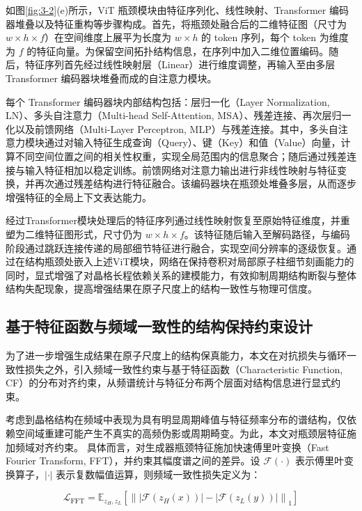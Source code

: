如图\ref{fig:3-2}(e)所示，ViT 瓶颈模块由特征序列化、线性映射、Transformer 编码器堆叠以及特征重构等步骤构成。首先，将瓶颈处融合后的二维特征图（尺寸为 $w \times h \times f$）在空间维度上展平为长度为 $w \times h$ 的 token 序列，每个 token 为维度为 $f$ 的特征向量。为保留空间拓扑结构信息，在序列中加入二维位置编码。随后，特征序列首先经过线性映射层（Linear）进行维度调整，再输入至由多层 Transformer 编码器块堆叠而成的自注意力模块。

每个 Transformer 编码器块内部结构包括：层归一化（Layer Normalization, LN）、多头自注意力（Multi-head Self-Attention, MSA）、残差连接、再次层归一化以及前馈网络（Multi-Layer Perceptron, MLP）与残差连接。其中，多头自注意力模块通过对输入特征生成查询（Query）、键（Key）和值（Value）向量，计算不同空间位置之间的相关性权重，实现全局范围内的信息聚合；随后通过残差连接与输入特征相加以稳定训练。前馈网络对注意力输出进行非线性映射与特征变换，并再次通过残差结构进行特征融合。该编码器块在瓶颈处堆叠多层，从而逐步增强特征的全局上下文表达能力。

经过Transformer模块处理后的特征序列通过线性映射恢复至原始特征维度，并重塑为二维特征图形式，尺寸仍为 $w \times h \times f$。该特征随后输入至解码路径，与编码阶段通过跳跃连接传递的局部细节特征进行融合，实现空间分辨率的逐级恢复。通过在结构瓶颈处嵌入上述ViT模块，网络在保持卷积对局部原子柱细节刻画能力的同时，显式增强了对晶格长程依赖关系的建模能力，有效抑制周期结构断裂与整体结构失配现象，提高增强结果在原子尺度上的结构一致性与物理可信度。

\subsection{基于特征函数与频域一致性的结构保持约束设计}
为了进一步增强生成结果在原子尺度上的结构保真能力，本文在对抗损失与循环一致性损失之外，引入频域一致性约束与基于特征函数（Characteristic Function, CF）的分布对齐约束，从频谱统计与特征分布两个层面对结构信息进行显式约束。

考虑到晶格结构在频域中表现为具有明显周期峰值与特征频率分布的谱结构，仅依赖空间域重建可能产生不真实的高频伪影或周期畸变。为此，本文对瓶颈层特征施加频域对齐约束。
具体而言，对生成器瓶颈特征施加快速傅里叶变换（Fast Fourier Transform, FFT），并约束其幅度谱之间的差异。设 $\mathcal{F}(\cdot)$ 表示傅里叶变换算子，$|\cdot|$ 表示复数幅值运算，则频域一致性损失定义为：

\begin{equation}
\mathcal{L}_{\mathrm{FFT}} =
\mathbb{E}_{z_H, z_L}
\left[
\left\|
\left|
\mathcal{F}(z_H(x))
\right|
-
\left|
\mathcal{F}(z_L(y))
\right|
\right\|_1
\right]
\end{equation}


